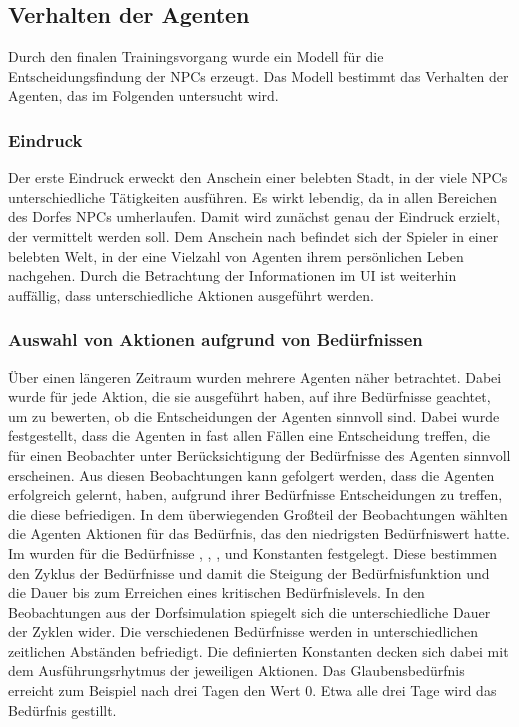 \subsection{Verhalten der Agenten}\label{7_result_agent_behavior}
Durch den finalen Trainingsvorgang wurde ein Modell für die Entscheidungsfindung der NPCs erzeugt. Das Modell bestimmt das Verhalten der Agenten, das im Folgenden untersucht wird.


\subsubsection{Eindruck}
Der erste Eindruck erweckt den Anschein einer belebten Stadt, in der viele NPCs unterschiedliche Tätigkeiten ausführen. Es wirkt lebendig, da in allen Bereichen des Dorfes NPCs umherlaufen. Damit wird zunächst genau der Eindruck erzielt, der vermittelt werden soll. Dem Anschein nach befindet sich der Spieler in einer belebten Welt, in der eine Vielzahl von Agenten ihrem persönlichen Leben nachgehen. Durch die Betrachtung der Informationen im UI ist weiterhin auffällig, dass unterschiedliche Aktionen ausgeführt werden.


\subsubsection{Auswahl von Aktionen aufgrund von Bedürfnissen}
Über einen längeren Zeitraum wurden mehrere Agenten näher betrachtet. Dabei wurde für jede Aktion, die sie ausgeführt haben, auf ihre Bedürfnisse geachtet, um zu bewerten, ob die Entscheidungen der Agenten sinnvoll sind. Dabei wurde festgestellt, dass die Agenten in fast allen Fällen eine Entscheidung treffen, die für einen Beobachter unter Berücksichtigung der Bedürfnisse des Agenten sinnvoll erscheinen. Aus diesen Beobachtungen kann gefolgert werden, dass die Agenten erfolgreich gelernt, haben, aufgrund ihrer Bedürfnisse Entscheidungen zu treffen, die diese befriedigen. In dem überwiegenden Großteil der Beobachtungen wählten die Agenten Aktionen für das Bedürfnis, das den niedrigsten Bedürfniswert hatte.
Im  wurden für die Bedürfnisse , , ,  und  Konstanten festgelegt. Diese bestimmen den Zyklus der Bedürfnisse und damit die Steigung der Bedürfnisfunktion und die Dauer bis zum Erreichen eines kritischen Bedürfnislevels. In den Beobachtungen aus der Dorfsimulation spiegelt sich die unterschiedliche Dauer der Zyklen wider. Die verschiedenen Bedürfnisse werden in unterschiedlichen zeitlichen Abständen befriedigt. Die definierten Konstanten decken sich dabei mit dem Ausführungsrhytmus der jeweiligen Aktionen. Das Glaubensbedürfnis erreicht zum Beispiel nach drei Tagen den Wert $0$. Etwa alle drei Tage wird das Bedürfnis gestillt.

